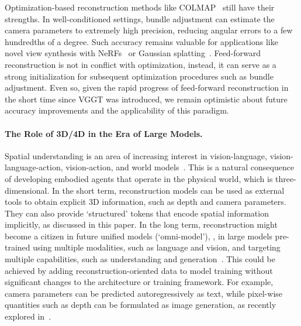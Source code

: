 Optimization-based reconstruction methods like COLMAP~\cite{schonberger16structure-from-motion} still have their strengths.
In well-conditioned settings, bundle adjustment can estimate the camera parameters to extremely high precision, reducing angular errors to a few hundredths of a degree.
Such accuracy remains valuable for applications like novel view synthesis with NeRFs~\cite{mildenhall20nerf:} or Gaussian splatting~\cite{kerbl233d-gaussian}.
Feed-forward reconstruction is not in conflict with optimization, instead, it can serve as a strong initialization for subsequent optimization procedures such as bundle adjustment.
Even so, given the rapid progress of feed-forward reconstruction in the short time since VGGT was introduced, we remain optimistic about future accuracy improvements and the applicability of this paradigm.

\paragraph{The Role of 3D/4D in the Era of Large Models.}

Spatial understanding is an area of increasing interest in vision-language, vision-language-action, vision-action, and world models~\cite{
chen24spatialvlm:,cheng24spatialrgpt:,zitkovich23rt-2:,cai26depthlm:,kim25openvla:,
team25gemini,hu23gaia-1:,li26causal,parker-holder25genie,nvidia25cosmos}. 
This is a natural consequence of developing embodied agents that operate in the physical world, which is three-dimensional.
In the short term, reconstruction models can be used as external tools to obtain explicit 3D information, such as depth and camera parameters.  
% 
They can also provide `structured' tokens that encode spatial information implicitly, as discussed in this paper. 
% 
In the long term, reconstruction might become a citizen in future unified models (`omni-model'), \ie, in large models pre-trained using multiple modalities, such as language and vision, and targeting multiple capabilities, such as understanding and generation~\cite{wang24emu3:,zhou25transfusion:,tong26beyond,team26longcat-next:,wang26ernie,team24chameleon:,wu25janus:,deng25emerging}. 
% 
This could be achieved by adding reconstruction-oriented data to model training without significant changes to the architecture or training framework. 
% 
For example, camera parameters can be predicted autoregressively as text, while pixel-wise quantities such as depth can be formulated as image generation, as recently explored in~\cite{yang26context}.



